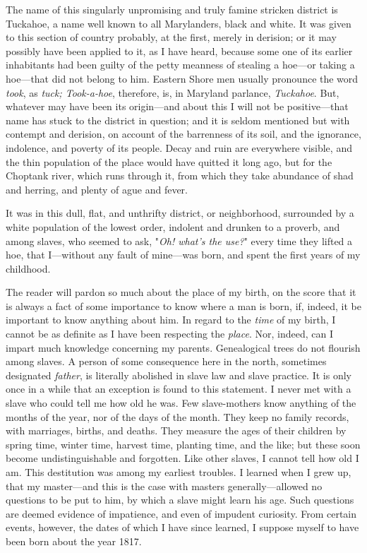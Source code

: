 The name of this singularly unpromising and truly famine stricken
district is Tuckahoe, a name well known to all Marylanders, black and
white. It was given to this section of country probably, at the first,
merely in derision; or it may possibly have been
{\protect\hypertarget{34}{}{}}applied to it, as I have heard, because
some one of its earlier inhabitants had been guilty of the petty
meanness of stealing a hoe---or taking a hoe---that did not belong to
him. Eastern Shore men usually pronounce the word \emph{took}, as
\emph{tuck; Took-a-hoe}, therefore, is, in Maryland parlance,
\emph{Tuckahoe}. But, whatever may have been its origin---and about this
I will not be positive---that name has stuck to the district in
question; and it is seldom mentioned but with contempt and derision, on
account of the barrenness of its soil, and the ignorance, indolence, and
poverty of its people. Decay and ruin are everywhere visible, and the
thin population of the place would have quitted it long ago, but for the
Choptank river, which runs through it, from which they take abundance of
shad and herring, and plenty of ague and fever.

It was in this dull, flat, and unthrifty district, or neighborhood,
surrounded by a white population of the lowest order, indolent and
drunken to a proverb, and among slaves, who seemed to ask, "\emph{Oh!
what's the use?}" every time they lifted a hoe, that I---without any
fault of mine---was born, and spent the first years of my childhood.

The reader will pardon so much about the place of my birth, on the score
that it is always a fact of some importance to know where a man is born,
if, indeed, it be important to know anything about him. In regard to the
\emph{time} of my birth, I cannot be as definite as I have been
respecting the \emph{place}. Nor, indeed, can I impart much knowledge
concerning my parents. Genealogical trees do not flourish among slaves.
A person of some consequence here in the north,
{\protect\hypertarget{35}{}{}}sometimes designated \emph{father}, is
literally abolished in slave law and slave practice. It is only once in
a while that an exception is found to this statement. I never met with a
slave who could tell me how old he was. Few slave-mothers know anything
of the months of the year, nor of the days of the month. They keep no
family records, with marriages, births, and deaths. They measure the
ages of their children by spring time, winter time, harvest time,
planting time, and the like; but these soon become undistinguishable and
forgotten. Like other slaves, I cannot tell how old I am. This
destitution was among my earliest troubles. I learned when I grew up,
that my master---and this is the case with masters generally---allowed
no questions to be put to him, by which a slave might learn his age.
Such questions are deemed evidence of impatience, and even of impudent
curiosity. From certain events, however, the dates of which I have since
learned, I suppose myself to have been born about the year 1817.

